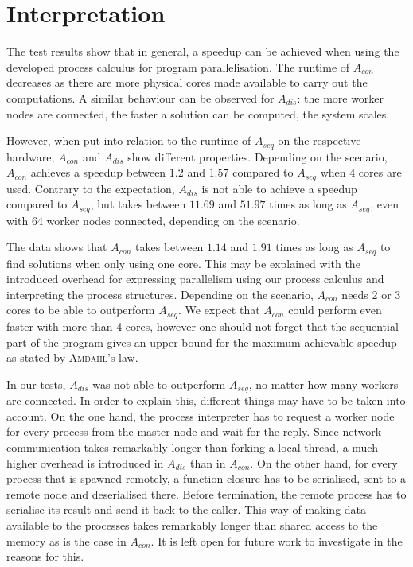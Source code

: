 \clearpage
\section{Interpretation}
The test results show that in general, a speedup can be achieved when using the developed process calculus for program parallelisation. The runtime of $A_{con}$ decreases as there are more physical cores made available to carry out the computations. A similar behaviour can be observed for $A_{dis}$: the more worker nodes are connected, the faster a solution can be computed, the system scales.

However, when put into relation to the runtime of $A_{seq}$ on the respective hardware, $A_{con}$ and $A_{dis}$ show different properties. Depending on the scenario, $A_{con}$ achieves a speedup between $1.2$ and $1.57$ compared to $A_{seq}$ when 4 cores are used. Contrary to the expectation, $A_{dis}$ is not able to achieve a speedup compared to $A_{seq}$, but takes between $11.69$ and $51.97$ times as long as $A_{seq}$, even with 64 worker nodes connected, depending on the scenario.

The data shows that $A_{con}$ takes between $1.14$ and $1.91$ times as long as $A_{seq}$ to find solutions when only using one core. This may be explained with the introduced overhead for expressing parallelism using our process calculus and interpreting the process structures. Depending on the scenario, $A_{con}$ needs 2 or 3 cores to be able to outperform $A_{seq}$. We expect that $A_{con}$ could perform even faster with more than 4 cores, however one should not forget that the sequential part of the program gives an upper bound for the maximum achievable speedup as stated by \textsc{Amdahl}'s law.

In our tests, $A_{dis}$ was not able to outperform $A_{seq}$, no matter how many workers are connected. In order to explain this, different things may have to be taken into account. On the one hand, the process interpreter has to request a worker node for every process from the master node and wait for the reply. Since network communication takes remarkably longer than forking a local thread, a much higher overhead is introduced in $A_{dis}$ than in $A_{con}$. On the other hand, for every process that is spawned remotely, a function closure has to be serialised, sent to a remote node and deserialised there. Before termination, the remote process has to serialise its result and send it back to the caller. This way of making data available to the processes takes remarkably longer than shared access to the memory as is the case in $A_{con}$. It is left open for future work to investigate in the reasons for this.